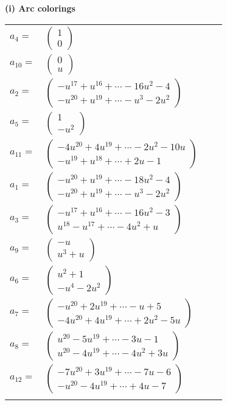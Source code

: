 \documentclass[1p]{elsarticle_modified}
\theoremstyle{definition}
\begin{document}
\flushleft \textbf{(i) Arc colorings}\\
\begin{tabular}{m{7pt} m{180pt} m{7pt} m{180pt} }
\flushright $a_{4}=$&$\begin{pmatrix}1\\0\end{pmatrix}$ \\
\flushright $a_{10}=$&$\begin{pmatrix}0\\u\end{pmatrix}$ \\
\flushright $a_{2}=$&$\begin{pmatrix}- u^{17}+u^{16}+\cdots-16 u^2-4\\- u^{20}+u^{19}+\cdots- u^3-2 u^2\end{pmatrix}$ \\
\flushright $a_{5}=$&$\begin{pmatrix}1\\- u^2\end{pmatrix}$ \\
\flushright $a_{11}=$&$\begin{pmatrix}-4 u^{20}+4 u^{19}+\cdots-2 u^2-10 u\\- u^{19}+u^{18}+\cdots+2 u-1\end{pmatrix}$ \\
\flushright $a_{1}=$&$\begin{pmatrix}- u^{20}+u^{19}+\cdots-18 u^2-4\\- u^{20}+u^{19}+\cdots- u^3-2 u^2\end{pmatrix}$ \\
\flushright $a_{3}=$&$\begin{pmatrix}- u^{17}+u^{16}+\cdots-16 u^2-3\\u^{18}- u^{17}+\cdots-4 u^2+u\end{pmatrix}$ \\
\flushright $a_{9}=$&$\begin{pmatrix}- u\\u^3+u\end{pmatrix}$ \\
\flushright $a_{6}=$&$\begin{pmatrix}u^2+1\\- u^4-2 u^2\end{pmatrix}$ \\
\flushright $a_{7}=$&$\begin{pmatrix}- u^{20}+2 u^{19}+\cdots- u+5\\-4 u^{20}+4 u^{19}+\cdots+2 u^2-5 u\end{pmatrix}$ \\
\flushright $a_{8}=$&$\begin{pmatrix}u^{20}-5 u^{19}+\cdots-3 u-1\\u^{20}-4 u^{19}+\cdots-4 u^2+3 u\end{pmatrix}$ \\
\flushright $a_{12}=$&$\begin{pmatrix}-7 u^{20}+3 u^{19}+\cdots-7 u-6\\- u^{20}-4 u^{19}+\cdots+4 u-7\end{pmatrix}$\\&\end{tabular}
\end{document}
